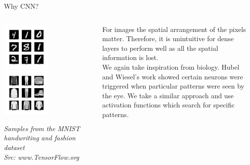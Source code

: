 \begin{frame}{Why CNN?}
	\begin{columns}[T]
        \begin{column}{0.4\textwidth}
			\begin{center}
				\includegraphics[width=0.5\textwidth]{images/mnist.png}\\
				\includegraphics[width=0.5\textwidth]{images/mnist_f.png}\\
			\end{center}
			\tiny{\textit{Samples from the MNIST handwriting and fashion dataset\\ Src: www.TensorFlow.org}}
        \end{column}
	    \begin{column}{0.6\textwidth} 
			For images the spatial arrangement of the pixels matter. Therefore, it is unintuitive for dense layers to perform well as all the spatial information is lost.\\\pause
			We again take inspiration from biology. Hubel and Wiesel's work showed certain neurons were triggered when particular patterns were seen by the eye. We take a similar approach and use activation functions which search for specific patterns.
    	\end{column}
    \end{columns}
\end{frame}

